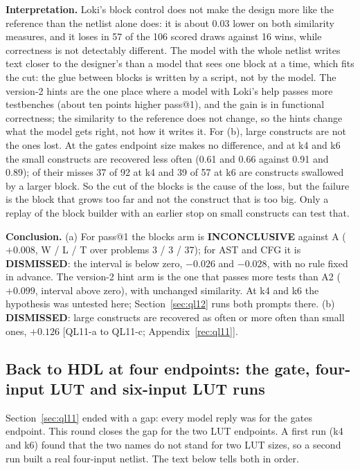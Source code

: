 \documentclass[conference]{IEEEtran}
\newcommand{\verdict}[1]{\textbf{\textsc{#1}}}
\newcommand{\hev}[1]{\par\smallskip\noindent\textbf{#1}}
\begin{document}
\hev{Interpretation.} Loki's block control does not make the design more like the reference than the netlist alone does: it is about 0.03 lower on both similarity measures, and it loses in 57 of the 106 scored draws against 16 wins, while correctness is not detectably different. The model with the whole netlist writes text closer to the designer's than a model that sees one block at a time, which fits the cut: the glue between blocks is written by a script, not by the model. The version-2 hints are the one place where a model with Loki's help passes more testbenches (about ten points higher pass@1), and the gain is in functional correctness; the similarity to the reference does not change, so the hints change what the model gets right, not how it writes it. For (b), large constructs are not the ones lost. At the gates endpoint size makes no difference, and at k4 and k6 the small constructs are recovered less often (0.61 and 0.66 against 0.91 and 0.89); of their misses 37 of 92 at k4 and 39 of 57 at k6 are constructs swallowed by a larger block. So the cut of the blocks is the cause of the loss, but the failure is the block that grows too far and not the construct that is too big. Only a replay of the block builder with an earlier stop on small constructs can test that.

\hev{Conclusion.} (a) For pass@1 the blocks arm is \verdict{INCONCLUSIVE} against A ($+0.008$, W / L / T over problems 3 / 3 / 37); for AST and CFG it is \verdict{DISMISSED}: the interval is below zero, $-0.026$ and $-0.028$, with no rule fixed in advance. The version-2 hint arm is the one that passes more tests than A2 ($+0.099$, interval above zero), with unchanged similarity. At k4 and k6 the hypothesis was untested here; Section~\ref{sec:ql12} runs both prompts there. (b) \verdict{DISMISSED}: large constructs are recovered as often or more often than small ones, $+0.126$ [QL11-a to QL11-c; Appendix~\ref{rec:ql11}].

\subsection{Back to HDL at four endpoints: the gate, four-input LUT and six-input LUT runs}
\label{arg:ql12}
\label{sec:ql12}

Section~\ref{sec:ql11} ended with a gap: every model reply was for the gates endpoint. This round closes the gap for the two LUT endpoints. A first run (k4 and k6) found that the two names do not stand for two LUT sizes, so a second run built a real four-input netlist. The text below tells both in order.
\end{document}
